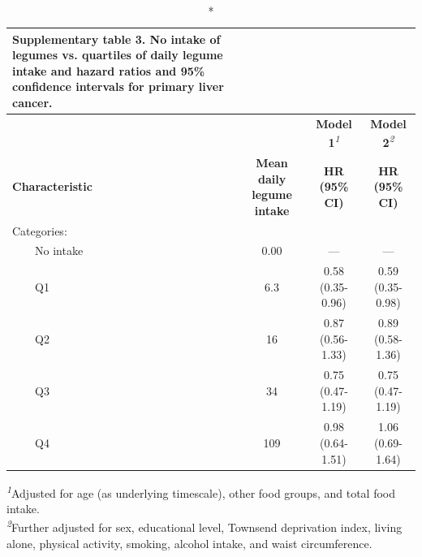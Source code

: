 \documentclass[sn-basic,Numbered,pdflatex]{sn-jnl}
\begin{document}
\begingroup
\setlength{}
\setlength{}\setlength{\LTpost}{0mm}
\begin{longtable}{@{\extracolsep{\fill}}lccc}
\caption*{
{\large \textbf{Supplementary table 3. No intake of legumes vs. quartiles of daily legume intake and hazard ratios and 95\% confidence intervals for primary liver cancer.}}
} \\ 
\toprule
 &  & \textbf{Model 1}\textsuperscript{\textit{1}} & \textbf{Model 2}\textsuperscript{\textit{2}} \\ 
\cmidrule(lr){3-3} \cmidrule(lr){4-4}
\textbf{Characteristic} & \textbf{Mean daily legume intake} & \textbf{HR} \textbf{(95\% CI)} & \textbf{HR} \textbf{(95\% CI)} \\ 
\midrule\addlinespace[2.5pt]
Categories: &  &  &  \\ 
    No intake & 0.00 & — & — \\ 
    Q1 & 6.3 & 0.58 (0.35-0.96) & 0.59 (0.35-0.98) \\ 
    Q2 & 16 & 0.87 (0.56-1.33) & 0.89 (0.58-1.36) \\ 
    Q3 & 34 & 0.75 (0.47-1.19) & 0.75 (0.47-1.19) \\ 
    Q4 & 109 & 0.98 (0.64-1.51) & 1.06 (0.69-1.64) \\ 
\bottomrule
\end{longtable}
\begin{minipage}{\linewidth}
\textsuperscript{\textit{1}}Adjusted for age (as underlying timescale), other food groups, and total food intake.\\
\textsuperscript{\textit{2}}Further adjusted for sex, educational level, Townsend deprivation index, living alone, physical activity, smoking, alcohol intake, and waist circumference.\\
\end{minipage}
\endgroup

\newpage
\end{document}
